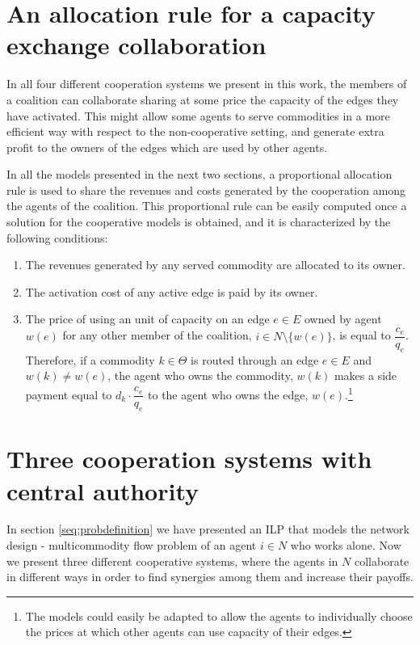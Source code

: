 \documentclass{article}
\begin{document}
\section{An allocation rule for a capacity exchange collaboration}
\label{seq:allocrule}
In all four different cooperation systems we present in this work, the members of a coalition can collaborate sharing at some price the capacity of the edges they have activated. This might allow some agents to serve commodities in a more efficient way with respect to the non-cooperative setting, and generate extra profit to the owners of the edges which are used by other agents.

In all the models presented in the next two sections, a proportional allocation rule is used to share the revenues and costs generated by the cooperation among the agents of the coalition. This proportional rule can be easily computed once a solution for the cooperative models is obtained, and it is characterized by the following conditions:
\begin{enumerate}
    \item The revenues generated by any served commodity are
    allocated to its owner.
    \item The activation cost of any active edge is paid by its owner.
    \item The price of using an unit of capacity on an edge $e\in E$ owned by agent $w(e)$ for any other member of the coalition, $i\in N\setminus\{w(e)\}$, is equal to $\dfrac{c_e}{q_e}$. Therefore,  if a commodity $k\in \Theta$ is routed through an edge $e	\in E$ and $w(k)\not = w(e)$, the agent who owns the commodity, $w(k)$ makes a side payment equal to $d_k \cdot\dfrac{c_e}{q_e}$ to the agent who owns the edge, $w(e)$.\footnote{The models could easily be adapted to allow the agents to individually choose the prices at which other agents can use capacity of their edges.}
\end{enumerate}

\section{Three cooperation systems with central authority} \label{seq:centrmodels}

In section \ref{seq:probdefinition} we have presented an ILP that models the network design - multicommodity flow problem of an agent $i\in N$ who works alone. Now we present three different cooperative systems, where the agents in $N$ collaborate in different ways in order to find synergies among them and increase their payoffs.
\end{document}
